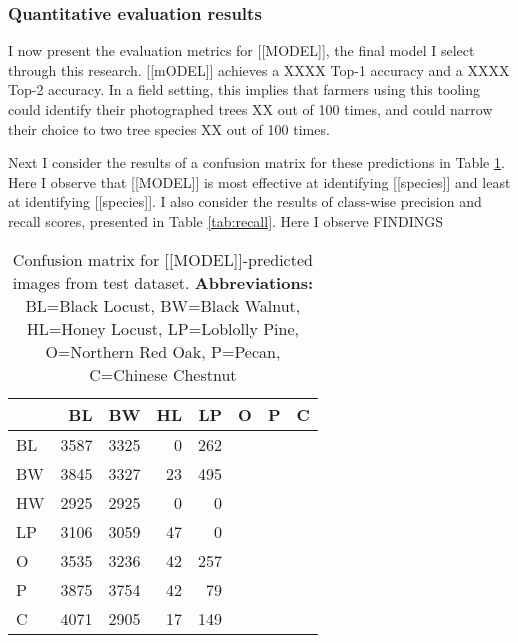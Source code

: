 \documentclass[10pt,twocolumn,letterpaper]{article}
\begin{document}
\subsubsection{Quantitative evaluation results}
I now present the evaluation metrics for [[MODEL]], the final model I select through this research. [[mODEL]] achieves a XXXX Top-1 accuracy and a XXXX Top-2 accuracy. In a field setting, this implies that farmers using this tooling could identify their photographed trees XX out of 100 times, and could narrow their choice to two tree species XX out of 100 times. 

Next I consider the results of a confusion matrix for these predictions in Table \ref{tab:confusion}. Here I observe that [[MODEL]] is most effective at identifying [[species]] and least at identifying [[species]]. I also consider the results of class-wise precision and recall scores, presented in Table \ref{tab:recall}. Here I observe FINDINGS

\begin{table}[!htbp]
  \begin{center}
    \small
  \begin{tabular}{|l|r|r|r|r|r|r|r|}
  \hline
  & BL & BW & HL & LP & O & P & C\\
  \hline\hline
  BL& 3587 & 3325 & 0 & 262\\
   BW & 3845 & 3327 & 23 & 495\\
   HW & 2925 & 2925 & 0 & 0\\
   LP & 3106 & 3059 & 47 & 0\\
   O & 3535 & 3236 & 42 & 257\\
   P & 3875 & 3754 & 42 & 79\\
   C & 4071 & 2905 & 17 & 149\\
  \hline
  \end{tabular}
  \end{center}
  \caption{\label{tab:confusion} Confusion matrix for [[MODEL]]-predicted images from test dataset. \textbf{Abbreviations:} BL=Black Locust, BW=Black Walnut, HL=Honey Locust, LP=Loblolly Pine, O=Northern Red Oak, P=Pecan, C=Chinese Chestnut}
  \end{table}
\end{document}
